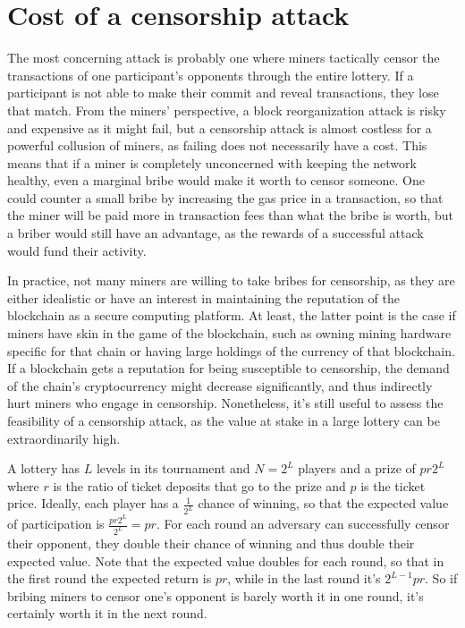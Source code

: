 \section{Cost of a censorship attack}
\label{sec:censorship}
The most concerning attack is probably one where miners tactically censor the transactions of one participant's opponents through the entire lottery. If a participant is not able to make their commit and reveal transactions, they lose that match. From the miners' perspective, a block reorganization attack is risky and expensive as it might fail, but a censorship attack is almost costless for a powerful collusion of miners, as failing does not necessarily have a cost. This means that if a miner is completely unconcerned with keeping the network healthy, even a marginal bribe would make it worth to censor someone. One could counter a small bribe by increasing the gas price in a transaction, so that the miner will be paid more in transaction fees than what the bribe is worth, but a briber would still have an advantage, as the rewards of a successful attack would fund their activity. 

In practice, not many miners are willing to take bribes for censorship, as they are either idealistic or have an interest in maintaining the reputation of the blockchain as a secure computing platform. At least, the latter point is the case if miners have skin in the game of the blockchain, such as owning mining hardware specific for that chain or having large holdings of the currency of that blockchain. If a blockchain gets a reputation for being susceptible to censorship, the demand of the chain's cryptocurrency might decrease significantly, and thus indirectly hurt miners who engage in censorship. Nonetheless, it's still useful to assess the feasibility of a censorship attack, as the value at stake in a large lottery can be extraordinarily high.

A lottery has $L$ levels in its tournament and $N=2^L$ players and a prize of $p r 2^L$ where $r$ is the ratio of ticket deposits that go to the prize and $p$ is the ticket price. Ideally, each player has a $\frac{1}{2^L}$ chance of winning, so that the expected value of participation is $\frac{p r 2^L}{2^L}=pr$. For each round an adversary can successfully censor their opponent, they double their chance of winning and thus double their expected value. Note that the expected value doubles for each round, so that in the first round the expected return is $pr$, while in the last round it's $2^{L-1}pr$. So if bribing miners to censor one's opponent is barely worth it in one round, it's certainly worth it in the next round.

